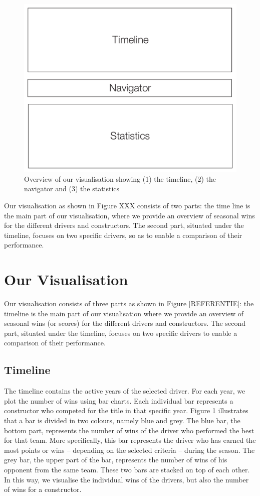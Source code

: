 \documentclass{sigchi}
\begin{document}
\begin{figure}[H]
  \centering
  \includegraphics[width=1\textwidth]{images/layout.pdf}
  \caption{Overview of our visualisation showing (1) the timeline, (2) the navigator and (3) the statistics}
  \label{fig:layout}
\end{figure}


Our visualisation as shown in Figure XXX consists of two parts: the time line is the main part of our visualisation, where we provide an overview of seasonal wins for the different drivers and constructors. The second part, situated under the timeline, focuses on two specific drivers, so as to enable a comparison of their performance. 

\section{Our Visualisation}
Our visualisation consists of three parts as shown in Figure [REFERENTIE]: the timeline is the main part of our visualisation where we provide an overview of seasonal wins (or scores) for the different drivers and constructors. The second part, situated under the timeline, focuses on two specific drivers to enable a comparison of their performance.  

\subsection{Timeline}

The timeline contains the active years of the selected driver. For each year, we plot the number of wins using bar charts. Each individual bar represents a constructor who competed for the title in that specific year. Figure 1 illustrates that a bar is divided in two colours, namely blue and grey. The blue bar, the bottom part, represents the number of wins of the driver who performed the best for that team. More specifically, this bar represents the driver who has earned the most points or wins – depending on the selected criteria – during the season. The grey bar, the upper part of the bar, represents the number of wins of his opponent from the same team. These two bars are stacked on top of each other. In this way, we visualise the individual wins of the drivers, but also the number of wins for a constructor. 
 
\end{document}
